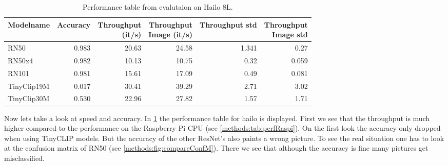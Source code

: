 \begin{table}[!h]
    \centering
    \begin{tabular}{l|rrrrr}
    \hline
    Modelname & Accuracy & \makecell{Throughput\\(it/s)} & \makecell{Throughput \\ Image (it/s)} & Throughput std & \makecell{Throughput\\Image std} \\ \hline
    RN50 & 0.983 & 20.63 & 24.58 & 1.341 & 0.27 \\ 
    RN50x4 & 0.982 & 10.13 & 10.75 & 0.32 & 0.059 \\ 
    RN101 & 0.981 & 15.61 & 17.09 & 0.49 & 0.081 \\
    TinyClip19M & 0.017 & 30.41 & 39.29 & 2.71 & 3.02 \\ 
    TinyClip30M & 0.530 & 22.96 & 27.82 & 1.57 & 1.71 \\ 
    \end{tabular}
    \label{methods:tab:perfHailo}
    \caption{Performance table from evalutaion on Hailo 8L.}
\end{table}

Now lets take a look at speed and accuracy.
In \cref{methods:tab:perfHailo} the performance table for hailo is displayed.
First we see that the throughput is much higher compared to the performance on the Raspberry Pi CPU (see \cref{methods:tab:perfRaspi}).
On the first look the accuracy only dropped when using TinyCLIP models.
But the accuracy of the other ResNet's also paints a wrong picture.
To see the real situation one has to look at the confusion matrix of RN50 (see \cref{methods:fig:compareConfM}).
There we see that although the accuracy is fine many pictures get misclassified.

